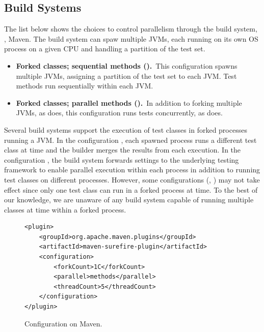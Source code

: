\subsection{Build Systems}
\label{sec:builder}

The list below shows the choices to control parallelism through the
build system, \eg{}, Maven.  The build system can spaw multiple JVMs,
each running on its own OS process on a given CPU and handling a
partition of the test set.

\begin{itemize}
\item
    \textbf{Forked classes; sequential methods (\ForkSeq).}~This
    configuration spawns multiple JVMs, assigning a partition of the
    test set to each JVM.  Test methods run sequentially within each
    JVM.
\item
    \textbf{Forked classes; parallel methods (\ForkParMeth).}~In
    addition to forking multiple JVMs, as \ForkSeq{} does, this
    configuration runs tests concurrently, as \SeqClassParMeth{} does.
\end{itemize}

Several build systems support the execution of test classes in forked
processes running a JVM. In the configuration \ForkSeq{}, each spawned
process runs a different test class at time and the builder merges the
results from each execution. In the configuration \ForkParMeth{}, the
build system forwards settings to the underlying testing framework to
enable parallel execution within each process in addition to running
test classes on different processes.  However, some configurations
(\eg, \ParClassSeqMeth) may not take effect since only one test class
can run in a forked process at time.  To the best of our knowledge, we
are unaware of any build system capable of running multiple classes at
time within a forked process.





\begin{figure}[h!]
\centering
\scriptsize
{}
\begin{lstlisting}
<plugin>
    <groupId>org.apache.maven.plugins</groupId>
    <artifactId>maven-surefire-plugin</artifactId>
    <configuration>
        <forkCount>1C</forkCount>
        <parallel>methods</parallel>
        <threadCount>5</threadCount>
    </configuration>
</plugin>
\end{lstlisting}
    \caption{\label{fig:surefire} Configuration \ForkParMeth{} on Maven.}
\end{figure}

